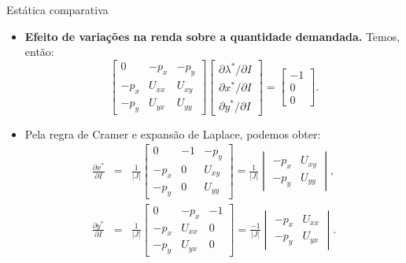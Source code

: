 \documentclass[10pt]{beamer}
\begin{document}
\begin{frame}{Estática comparativa}
\begin{itemize}
    \item \textbf{Efeito de variações na renda sobre a quantidade demandada.} Temos, então:
    \begin{equation}
        \begin{bmatrix}
            0 & -p_x & -p_y \\ -p_x & U_{xx} & U_{xy} \\ -p_y & U_{yx} & U_{yy}
        \end{bmatrix} \begin{bmatrix}
            \partial \lambda^*/\partial I \\ \partial x^*/\partial I \\ \partial y^*/\partial I
        \end{bmatrix} = \begin{bmatrix}
            -1 \\ 0 \\ 0
        \end{bmatrix}.
    \end{equation}
    \bigskip
    \item Pela regra de Cramer e expansão de Laplace, podemos obter:
    \begin{eqnarray}
    \frac{\partial x^*}{\partial I} &=& \frac{1}{|J|}\begin{bmatrix}
    0 & -1 & -p_y \\
    -p_x & 0 & U_{xy} \\
    -p_y & 0 & U_{yy}
    \end{bmatrix} = \frac{1}{|J|}\begin{vmatrix}
    -p_x & U_{xy} \\ -p_y & U_{yy}
    \end{vmatrix}, \\
    \frac{\partial y^*}{\partial I} &=& \frac{1}{|J|}\begin{bmatrix}
    0 & -p_x & -1 \\
    -p_x & U_{xx} & 0 \\
    -p_y & U_{yx} & 0
    \end{bmatrix} = \frac{-1}{|J|}\begin{vmatrix}
    -p_x & U_{xx} \\ -p_y & U_{yx}
    \end{vmatrix}.
    \end{eqnarray}
\end{itemize}
\end{frame}
\end{document}
